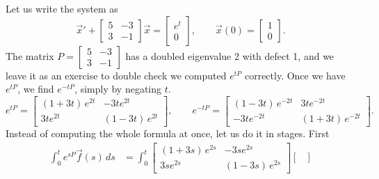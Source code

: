 \documentclass{ximera}
\begin{document}
\begin{exampleSol}
    Let us write the system as
    \begin{equation*}
        {\vec{x}}' +
        \begin{bmatrix} 
            5 & -3 \\ 
            3 & -1 
        \end{bmatrix}
        \vec{x} =
        \begin{bmatrix} 
            e^t \\ 
            0 
        \end{bmatrix} ,
        \qquad \vec{x}(0) = 
        \begin{bmatrix} 
            1 \\ 
            0 
        \end{bmatrix} .
    \end{equation*}
    The matrix
    $P = \left[
        \begin{smallmatrix} 
            5 & -3 \\ 
            3 & -1 
        \end{smallmatrix} 
    \right]$
    has a doubled eigenvalue 2 with defect 1, and we leave it as an exercise to double check we computed $e^{tP}$ correctly.  Once we have $e^{tP}$, we find $e^{-tP}$, simply by negating $t$.
    \begin{equation*}
        e^{tP} = 
        \begin{bmatrix}
            (1+3t)\,e^{2t} & -3te^{2t} \\
            3te^{2t} & (1-3t)\,e^{2t}
        \end{bmatrix}
        , \qquad e^{-tP} = 
        \begin{bmatrix}
            (1-3t)\,e^{-2t} & 3te^{-2t} \\
            -3te^{-2t} & (1+3t)\,e^{-2t}
        \end{bmatrix}.
    \end{equation*}
    Instead of computing the whole formula at once, let us do it in stages. First
    \begin{equation*}
        \begin{split}
            \int_0^t e^{sP}\vec{f}(s) \, ds & = \int_0^t
            \begin{bmatrix}
                (1+3s)\,e^{2s} & -3se^{2s} \\
                3se^{2s} & (1-3s)\,e^{2s}
            \end{bmatrix}
            \begin{bmatrix}

\end{bmatrix}
\end{split}
\end{equation*}
\end{exampleSol}
\end{document}
